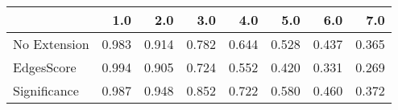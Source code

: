 \begin{tabular}{lrrrrrrr}
\toprule
{} &   1.0 &   2.0 &   3.0 &   4.0 &   5.0 &   6.0 &   7.0 \\
\midrule
No Extension & 0.983 & 0.914 & 0.782 & 0.644 & 0.528 & 0.437 & 0.365 \\
EdgesScore   & 0.994 & 0.905 & 0.724 & 0.552 & 0.420 & 0.331 & 0.269 \\
Significance & 0.987 & 0.948 & 0.852 & 0.722 & 0.580 & 0.460 & 0.372 \\
\bottomrule
\end{tabular}
